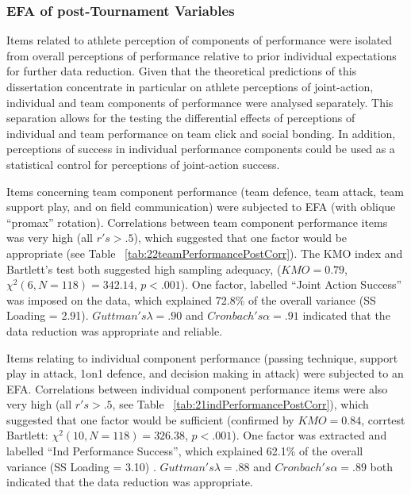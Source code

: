 \subsubsection{EFA of post-Tournament Variables}

Items related to athlete perception of components of performance were isolated from overall perceptions of performance relative to prior individual expectations for further data reduction. Given that the theoretical predictions of this dissertation concentrate in particular on athlete perceptions of joint-action, individual and team components of performance were analysed separately. This separation allows for the testing the differential effects of perceptions of individual and team performance on team click and social bonding. In addition, perceptions of success in individual performance components could be used as a statistical control for perceptions of joint-action success.

Items concerning team component performance (team defence, team attack, team support play, and on field communication) were subjected to EFA (with oblique ``promax'' rotation).  Correlations between team component performance items was very high (all $r's > .5$), which suggested that one factor would be appropriate (see Table ~\ref{tab:22teamPerformancePostCorr}). The KMO index and Bartlett's test both suggested high sampling adequacy, ($KMO = 0.79$, $\chi^2(6, N = 118) = 342.14$, $p < .001$).  One factor, labelled ``Joint Action Success'' was imposed on the data, which explained 72.8\% of the overall variance (SS Loading = 2.91). $Guttman's \lambda =.90$ and $Cronbach's \alpha = .91$ indicated that the data reduction was appropriate and reliable.


Items relating to individual component performance (passing technique, support play in attack, 1on1 defence, and decision making in attack) were subjected to an EFA.  Correlations between individual component performance items were also very high (all $r's > .5$, see Table ~\ref{tab:21indPerformancePostCorr}), which suggested that one factor would be sufficient (confirmed by $KMO =  0.84$, corrtest Bartlett: $\chi^2(10, N = 118) =  326.38$, $p < .001$).  One factor was extracted and labelled ``Ind Performance Success'', which explained 62.1\% of the overall variance (SS Loading = 3.10) .  $Guttman's \lambda =.88$ and $Cronbach's \alpha = .89$ both indicated that the data reduction was appropriate.

